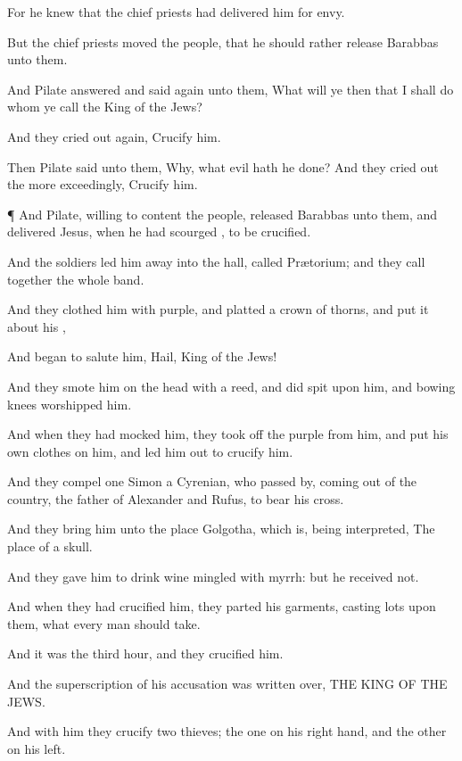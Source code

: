 {For he
knew
that the chief
priests had
delivered
him
for
envy.

But the chief
priests
moved the
people,
that he
should
rather
release
Barabbas unto
them.

And
Pilate
answered and
said
again unto
them,
What will
ye
then that I shall
do
{}
whom ye
call the
King of the
Jews?

And they cried
out
again,
Crucify
him.

Then
Pilate
said unto
them,
Why,
what
evil hath he
done?
And they cried
out the more
exceedingly,
Crucify
him.


\par }{\PP {}¶
And
{}
Pilate,
willing to
content the
people,
released
Barabbas unto
them,
and
delivered
Jesus, when he had
scourged
{},
to be
crucified.

And the
soldiers
led
him
away
into the
hall,
called
Prætorium;
and they call
together the
whole
band.

And they
clothed
him with
purple, and
platted a
crown of
thorns,
and put it
about
his
{},

And
began to
salute
him,
Hail,
King of the
Jews!

And they
smote
him on the
head with a
reed,
and did
spit upon
him,
and
bowing
{}
knees
worshipped
him.

And
when they had
mocked
him, they took
off the
purple
from
him,
and
put his
own
clothes on
him,
and
led
him
out
to
crucify
him.

And they
compel
one
Simon a
Cyrenian, who passed
by, coming
out
of the
country, the
father of
Alexander
and
Rufus,
to
bear
his
cross.

And they
bring
him
unto the
place
Golgotha,
which
is, being
interpreted, The
place of a
skull.

And they
gave
him to
drink
wine mingled with
myrrh:
but he
received
{}
not.

And when they had
crucified
him, they
parted
his
garments,
casting
lots
upon
them,
what every
man should
take.

And it
was the
third
hour,
and they
crucified
him.

And the
superscription of
his
accusation
was written
over, THE
KING OF THE
JEWS.

And
with
him they
crucify
two
thieves; the
one
on his right
hand,
and the
other
on
his
left.

}
